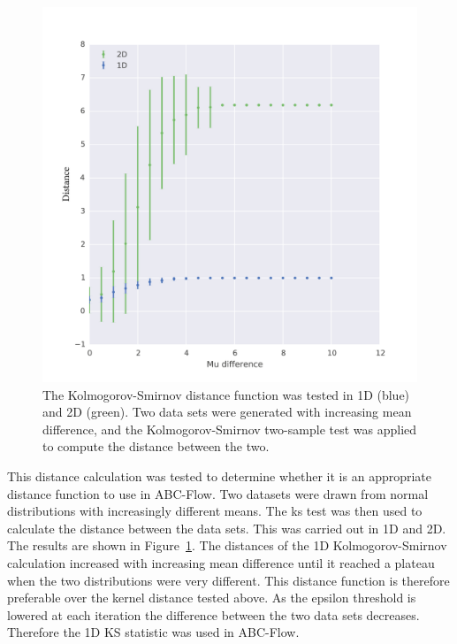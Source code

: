 \begin{figure}[tb]
\begin{center}
	\includegraphics[scale=0.5]{../../chapters/chapterABCFlow/images/epsilon_uniform_musd_KS2sam.png}			
	\caption[Range of distance values using the Kolmogorov-Smirnov distance]{\label{fig:ks-1d2d}The Kolmogorov-Smirnov distance function was tested in 1D (blue) and 2D (green). Two data sets were generated with increasing mean difference, and the Kolmogorov-Smirnov two-sample test was applied to compute the distance between the two.}
	\end{center}
\end{figure}

This distance calculation was tested to determine whether it is an appropriate distance function to use in ABC-Flow. Two datasets were drawn from normal distributions with increasingly different means. The \acrshort{ks} test was then used to calculate the distance between the data sets. This was carried out in 1D and 2D. The results are shown in Figure~\ref{fig:ks-1d2d}. The distances of the 1D Kolmogorov-Smirnov calculation increased with increasing mean difference until it reached a plateau when the two distributions were very different. This distance function is therefore preferable over the kernel distance tested above. As the epsilon threshold is lowered at each iteration the difference between the two data sets decreases. Therefore the 1D KS statistic was used in ABC-Flow. 

